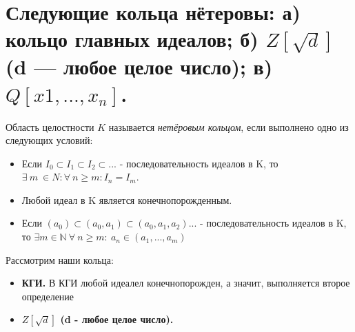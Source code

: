 \section{Следующие кольца нётеровы: а) кольцо главных идеалов; б) $Z[
\sqrt{d}]$ (d — любое целое число);
в) $Q[x1, . . . , x_n]$.}

\Def Область целостности $K$ называется \textit{нетёровым кольцом}, если выполнено одно из следующих условий:
\begin{itemize}
    \item [1] Если $I_0 \subset I_1 \subset I_2 \subset . . . $ - последовательность идеалов в K, то $\exists \ m \ \in N : \forall \ n \geq m :I_n = I_m$.
    \item [2] Любой идеал в K является конечнопорожденным.
    \item[3] Если $(a_0) \subset (a_0, a_1) \subset (a_0, a_1, a_2) ... $ - последовательность идеалов в K, то $\exists m \in \mathbb{N} \ \forall \ n \geq m: \ a_n \in (a_1, ..., a_m)$
\end{itemize}
Рассмотрим наши кольца:
\begin{itemize}
    \item [] \textbf{КГИ.} В КГИ любой идеалел конечнопорожден, а значит, выполняется второе определение
     \item [] \textbf{$Z[\sqrt{d}]$ (d - любое целое число).}
\end{itemize}